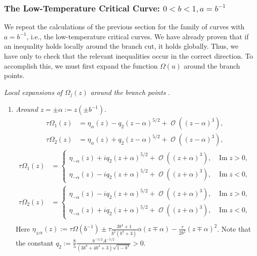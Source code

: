\documentclass[10pt,a4paper]{amsart}
\DeclareMathOperator{\OO}{\mathcal{O}}
\numberwithin{equation}{section}
\begin{document}
\iffalse
\subsubsection{The Low-Temperature Critical Curve: $0< b < 1, a = b^{-1}$}
We repeat the calculations of the previous section for the family of curves with $a = b^{-1}$, i.e., the low-temperature critical curves. We have already proven that if
an inequality holds locally around the branch cut, it holds globally. Thus, we have only to check that the relevant inequalities occur in the correct direction. To accomplish this, we must first expand the function $\Omega(u)$ around the branch points.

\begin{prop}\label{local-expansions-low-temp}
\textit{ Local expansions of $\Omega_j(z)$ around the branch points }.
 \begin{enumerate}\itemsep=0pt
 \item \textit{Around $z = \pm\alpha := z(\pm b^{-1}).$}
 \begin{align}
 \tau\Omega_1(z) &= \eta_\alpha(z) - q_2 (z-\alpha)^{5/2} + \OO((z-\alpha)^3),\\
 \tau\Omega_2(z) &= \eta_\alpha(z) + q_2 (z-\alpha)^{5/2} + \OO((z-\alpha)^3),
 \end{align}
 \begin{align}
 \tau\Omega_1(z) &=
 \begin{cases}
 \eta_{-\alpha}(z) + iq_2 (z+\alpha)^{5/2} + \OO((z+\alpha)^3), & \operatorname{Im} z>0,\\
 \eta_{-\alpha}(z) - iq_2 (z+\alpha)^{5/2} + \OO((z+\alpha)^3),& \operatorname{Im} z <0,
 \end{cases}\\
 \tau\Omega_2(z) &=
 \begin{cases}
 \eta_{-\alpha}(z) - iq_2 (z+\alpha)^{5/2} + \OO((z+\alpha)^3), & \operatorname{Im} z>0,\\
 \eta_{-\alpha}(z) + iq_2 (z+\alpha)^{5/2} + \OO((z+\alpha)^3),& \operatorname{Im} z <0,
 \end{cases}\\
 \end{align}
 Here $\eta_{\pm\alpha}(z) := \tau \Omega(b^{-1}) \pm \tau\frac{ 3b^4 + 1}{b^2(b^4 + 3)}\alpha (z\mp\alpha) - \frac{\tau}{2b^2} (z\mp\alpha)^2$. Note that the constant $q_2:=\frac{8}{5}\frac{b^{-5/2}A^{-5/2}}{(3b^8 + 4b^4 + 3)\sqrt{1-b^4} } >0$.


\end{enumerate}
\end{prop}
\end{document}
